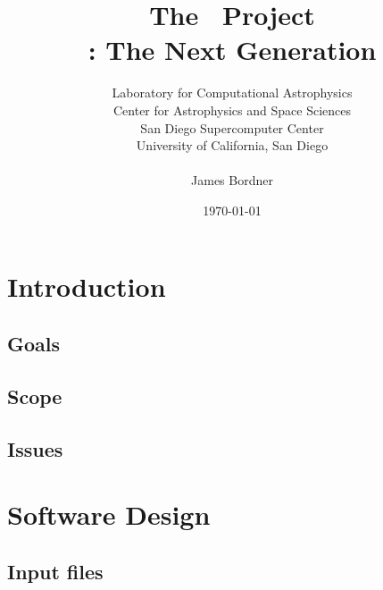 \documentclass{beamer}
\title[The \cello\ Project]
      {The \cello\ Project \\ \small{\enzo: The Next Generation}}
\author[James Bordner]{\small Laboratory for Computational Astrophysics \\ Center for Astrophysics and Space Sciences \\San Diego Supercomputer Center \\ University of California, San Diego \\ \ \\ James Bordner}
\date{\today}
\begin{document}
\frame{\titlepage}

\frame{\footnotesize
\tableofcontents}

\section{Introduction}

% 

\subsection{Goals}



\subsection{Scope}




\subsection{Issues}



\section{Software Design}

\subsection{Input files}
\end{document}
